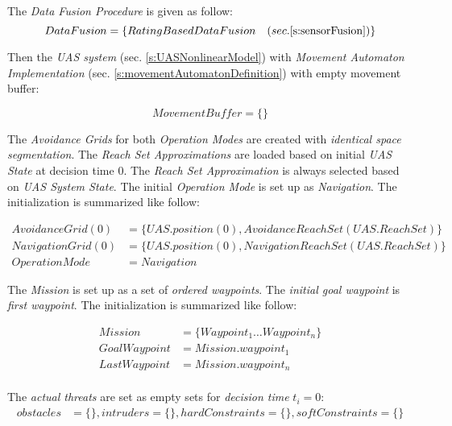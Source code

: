 \noindent The \emph{Data Fusion Procedure} is given as follow:
\begin{equation}
    DataFusion = \{Rating Based Data Fusion \quad (sec. \ref{s:sensorFusion})\}
\end{equation}

Then the \emph{UAS system} (sec. \ref{s:UASNonlinearModel}) with \emph{Movement Automaton Implementation} (sec. \ref{s:movementAutomatonDefinition}) with empty movement buffer:

\begin{equation}
    Movement Buffer = \{\}
\end{equation}

\noindent The \emph{Avoidance Grids} for both \emph{Operation Modes} are created with \emph{identical space segmentation}. The \emph{Reach Set Approximations} are loaded based on initial \emph{UAS State} at decision time $0$. The \emph{Reach Set Approximation} is always selected based on \emph{UAS System State}. The initial \emph{Operation Mode} is set up as \emph{Navigation}. The initialization is summarized like follow:

\begin{equation}
    \begin{aligned}
    Avoidance Grid(0) &= \{UAS.position(0),AvoidanceReachSet(UAS.ReachSet)\}\\
    Navigation Grid (0) &= \{UAS.position(0), NavigationReachSet(UAS.ReachSet)\}\\
    Operation Mode &= Navigation
    \end{aligned}
\end{equation}

The \emph{Mission} is set up as a set of \emph{ordered waypoints}. The \emph{initial goal waypoint} is \emph{first waypoint}. The initialization is summarized like follow:

\begin{equation}
    \begin{aligned}
    Mission &= \{Waypoint_1 \dots  Waypoint_n\}\\
    Goal Waypoint &= Mission.waypoint_1\\
    Last Waypoint &= Mission.waypoint_n\\
    \end{aligned}
\end{equation}

The \emph{actual threats} are set as empty sets for \emph{decision time} $t_i=0$:
\begin{equation}
    \begin{aligned}
    obstacles &= \{\}, intruders = \{\}, hard Constraints = \{\}, soft Constraints = \{\}\\
    \end{aligned}
\end{equation}



